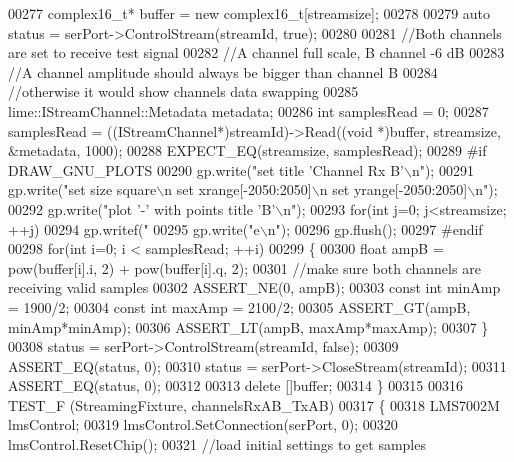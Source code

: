 \begin{DoxyCode}
{{00277     complex16_t* buffer = \textcolor{keyword}{new} complex16_t[streamsize];
00278 
00279     \textcolor{keyword}{auto} status = serPort->ControlStream(streamId, \textcolor{keyword}{true});
00280 
00281     \textcolor{comment}{//Both channels are set to receive test signal}
00282     \textcolor{comment}{//A channel full scale, B channel -6 dB}
00283     \textcolor{comment}{//A channel amplitude should always be bigger than channel B}
00284     \textcolor{comment}{//otherwise it would show channels data swapping}
00285     lime::IStreamChannel::Metadata metadata;
00286     \textcolor{keywordtype}{int} samplesRead = 0;
00287     samplesRead = ((IStreamChannel*)streamId)->Read((\textcolor{keywordtype}{void} *)buffer, streamsize, &metadata, 1000);
00288     EXPECT\_EQ(streamsize, samplesRead);
00289 \textcolor{preprocessor}{#if DRAW\_GNU\_PLOTS}
00290     gp.write(\textcolor{stringliteral}{"set title 'Channel Rx B'\(\backslash\)n"});
00291     gp.write(\textcolor{stringliteral}{"set size square\(\backslash\)n set xrange[-2050:2050]\(\backslash\)n set yrange[-2050:2050]\(\backslash\)n"});
00292     gp.write(\textcolor{stringliteral}{"plot '-' with points title 'B'\(\backslash\)n"});
00293     \textcolor{keywordflow}{for}(\textcolor{keywordtype}{int} j=0; j<streamsize; ++j)
00294         gp.writef(\textcolor{stringliteral}{"%
00295     gp.write(\textcolor{stringliteral}{"e\(\backslash\)n"});
00296     gp.flush();
00297 \textcolor{preprocessor}{#endif}
00298     \textcolor{keywordflow}{for}(\textcolor{keywordtype}{int} i=0; i < samplesRead; ++i)
00299     \{
00300         \textcolor{keywordtype}{float} ampB = pow(buffer[i].i, 2) + pow(buffer[i].q, 2);
00301         \textcolor{comment}{//make sure both channels are receiving valid samples}
00302         ASSERT\_NE(0, ampB);
00303         \textcolor{keyword}{const} \textcolor{keywordtype}{int} minAmp = 1900/2;
00304         \textcolor{keyword}{const} \textcolor{keywordtype}{int} maxAmp = 2100/2;
00305         ASSERT\_GT(ampB, minAmp*minAmp);
00306         ASSERT\_LT(ampB, maxAmp*maxAmp);
00307     \}
00308     status = serPort->ControlStream(streamId, \textcolor{keyword}{false});
00309     ASSERT\_EQ(status, 0);
00310     status = serPort->CloseStream(streamId);
00311     ASSERT\_EQ(status, 0);
00312 
00313     \textcolor{keyword}{delete} []buffer;
00314 \}
00315 
00316 TEST_F (StreamingFixture, channelsRxAB\_TxAB)
00317 \{
00318     LMS7002M lmsControl;
00319     lmsControl.SetConnection(serPort, 0);
00320     lmsControl.ResetChip();
00321     \textcolor{comment}{//load initial settings to get samples}
}}}
\end{DoxyCode}
